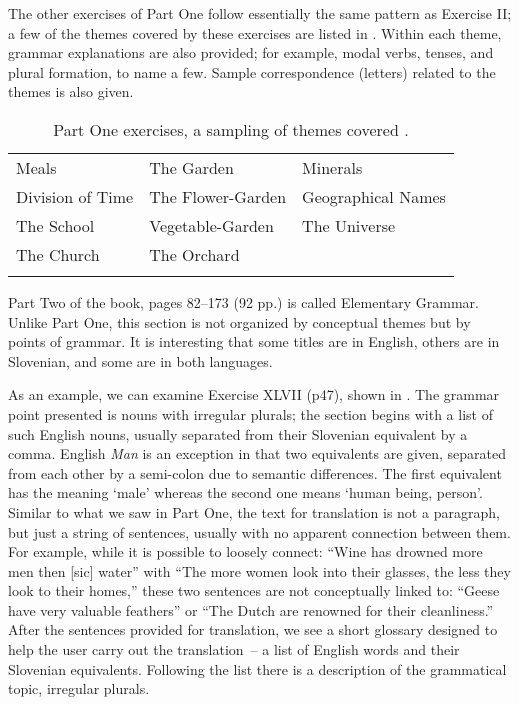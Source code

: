 \documentclass[output=paper,colorlinks,citecolor=brown,arabicfont,chinesefont]{langscibook}
\begin{document}
The other exercises of Part One follow essentially the same pattern as Exercise II; a few of the themes covered by these exercises are listed in . Within each theme, grammar explanations are also provided; for example, modal verbs, tenses, and plural formation, to name a few. Sample correspondence (letters) related to the themes is also given.

\begin{table}
\caption{Part One exercises, a sampling of themes covered \citep{Jeram1895}.}
\label{tab:excercises}
\begin{tabular}{lll}
\lsptoprule
Meals            & The Garden & Minerals \\
Division of Time & The Flower-Garden & Geographical Names \\
The School & Vegetable-Garden & The Universe \\
The Church & The Orchard &  \\
\lspbottomrule
\end{tabular}
\end{table}

Part Two of the book, pages 82–173 (92 pp.) is called Elementary Grammar. Unlike Part One, this section is not organized by conceptual themes but by points of grammar. It is interesting that some titles are in English, others are in Slovenian, and some are in both languages. 

As an example, we can examine Exercise XLVII (p47), shown in . The grammar point presented is nouns with irregular plurals; the section begins with a list of such English nouns, usually separated from their Slovenian equivalent by a comma. English \emph{Man} is an exception in that two equivalents are given, separated from each other by a semi-colon due to semantic differences. The first equivalent has the meaning ‘male’ whereas the second one means ‘human being, person’. Similar to what we saw in Part One, the text for translation is not a paragraph, but just a string of sentences, usually with no apparent connection between them. For example, while it is possible to loosely connect: “Wine has drowned more men then [sic] water” with “The more women look into their glasses, the less they look to their homes,” these two sentences are not conceptually linked to: “Geese have very valuable feathers” or “The Dutch are renowned for their cleanliness.” After the sentences provided for translation, we see a short glossary designed to help the user carry out the translation~-- a list of English words and their Slovenian equivalents. Following the list there is a description of the grammatical topic, irregular plurals.
\end{document}
